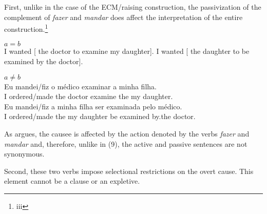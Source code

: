\documentclass[output=paper]{langsci/langscibook}
\begin{document}
First, unlike in the case of the ECM/raising construction, the passivization of the complement of \textit{fazer} and \textit{mandar} does affect the interpretation of the entire construction.\footnote{iii}

\ea%
    $a = b$ \citep[119]{Farrell1995}\label{ex:moreno:9}\\
    \ea I wanted [ the doctor to examine my daughter].
    \ex I wanted [ the daughter to be examined by the doctor].
    \z
\z

\ea%
           $a \neq b$\label{ex:moreno:10}\\
    \ea
    \gll Eu   mandei/fiz      o    médico   examinar  a    minha filha.\\
         I         ordered/made the doctor     examine    the my     daughter.\\
    \ex  
    \gll Eu   mandei/fiz    a     minha filha      ser examinada pelo    médico.\\
         I         ordered/made the  my      daughter  be examined    by.the doctor.\\
    \z
\z    

As \citet{Farrell1995} argues, the causee is affected by the action denoted by the verbs \textit{fazer} and \textit{mandar} and, therefore, unlike in (9), the active and passive sentences are not synonymous.

Second, these two verbs impose selectional restrictions on the overt cause. This element cannot be a clause or an expletive. 

    \z



\z
\end{document}
